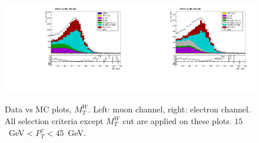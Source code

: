 \begin{figure}[htb]
  \begin{center}
   \includegraphics[width=0.5\textwidth]{../figs/figs_v11/MUON_WGamma/PrepareYields/c_TotalDATAvsMC_EtaCommon__WMtVERY_PRELIMINARY.pdf}\includegraphics[width=0.5\textwidth]{../figs/figs_v11/ELECTRON_WGamma/PrepareYields/c_TotalDATAvsMC_EtaCommon__WMtVERY_PRELIMINARY.pdf}
  \caption{Data vs MC plots, $M_T^W$. Left: muon channel, right: electron channel. All selection criteria except $M_{T}^W$ cut are applied on these plots. $15$~GeV$<P_T^{\gamma}<45$~GeV. }
  \label{fig:DATAvsMC_WMt}
  \end{center}
\end{figure}

